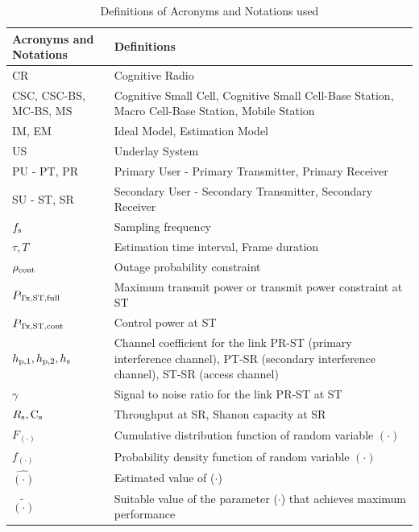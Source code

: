 \begin{table}
\renewcommand{\arraystretch}{1.2}
\caption{Definitions of Acronyms and Notations used}
\label{tb:tb1}
\centering
\footnotesize{
\begin{tabular}{p{}||p{}}
\hline
\bfseries Acronyms and Notations & \bfseries Definitions \\
\hline\hline
CR & Cognitive Radio\\ \hline
CSC, CSC-BS, MC-BS, MS & Cognitive Small Cell, Cognitive Small Cell-Base Station, Macro Cell-Base Station, Mobile Station\\ \hline
IM, EM & Ideal Model, Estimation Model \\ \hline
US & Underlay System \\ \hline
PU - PT, PR & Primary User - Primary Transmitter, Primary Receiver \\ \hline
SU - ST, SR & Secondary User - Secondary Transmitter, Secondary Receiver \\ \hline
$f_{\text{s}}$ & Sampling frequency\\ \hline
$\tau, T$ & Estimation time interval, Frame duration\\ \hline
$\rho_{\text{cont}}$ & Outage probability constraint \\ \hline
$P_{\text{Tx,ST,full}}$ & Maximum transmit power or transmit power constraint at ST \\ \hline
$P_{\text{Tx,ST,cont}}$ & Control power at ST \\ \hline
$h_{\text{p,1}}, h_{\text{p,2}}, h_{\text{s}}$ & Channel coefficient for the link PR-ST (primary interference channel), PT-SR (secondary interference channel), ST-SR (access channel) \\ \hline
$\gamma$ & Signal to noise ratio for the link PR-ST at ST \\ \hline
$R_{\text{s}}, \text{C}_{\text{s}}$ & Throughput at SR, Shanon capacity at SR \\ \hline
$F_{(\cdot)}$ & Cumulative distribution function of random variable $(\cdot)$\\ \hline
$f_{(\cdot)}$ & Probability density function of random variable $(\cdot)$\\ \hline
$\hat{(\cdot)}$ & Estimated value of ($\cdot$)\\ \hline
$\tilde{(\cdot)}$ & Suitable value of the parameter ($\cdot$) that achieves maximum performance \\ \hline

\end{tabular}}
\end{table}
